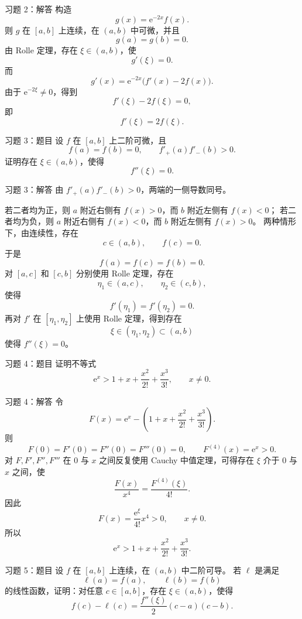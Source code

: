 \documentclass[aspectratio=169,10pt]{ctexbeamer}
\newcommand{\ee}{\mathrm{e}}
\begin{document}
\begin{frame}[t]{习题 2：解答}
\small
构造
\[
  g(x)=\ee^{-2x}f(x).
\]
则 $g$ 在 $[a,b]$ 上连续，在 $(a,b)$ 中可微，并且
\[
  g(a)=g(b)=0.
\]
由 Rolle 定理，存在 $\xi\in(a,b)$，使
\[
  g'(\xi)=0.
\]
而
\[
  g'(x)=\ee^{-2x}\bigl(f'(x)-2f(x)\bigr).
\]
由于 $\ee^{-2\xi}\ne0$，得到
\[
  f'(\xi)-2f(\xi)=0,
\]
即
\[
  f'(\xi)=2f(\xi).
\]
\end{frame}

\begin{frame}[t]{习题 3：题目}
\small
设 $f$ 在 $[a,b]$ 上二阶可微，且
\[
  f(a)=f(b)=0,\qquad f'_+(a)f'_-(b)>0.
\]
证明存在 $\xi\in(a,b)$，使得
\[
  f''(\xi)=0.
\]
\end{frame}

\begin{frame}[t]{习题 3：解答}
\footnotesize
由 $f'_+(a)f'_-(b)>0$，两端的一侧导数同号。

若二者均为正，则 $a$ 附近右侧有 $f(x)>0$，而 $b$ 附近左侧有 $f(x)<0$；
若二者均为负，则 $a$ 附近右侧有 $f(x)<0$，而 $b$ 附近左侧有 $f(x)>0$。
两种情形下，由连续性，存在
\[
  c\in(a,b),\qquad f(c)=0.
\]
于是
\[
  f(a)=f(c)=f(b)=0.
\]
对 $[a,c]$ 和 $[c,b]$ 分别使用 Rolle 定理，存在
\[
  \eta_1\in(a,c),\qquad \eta_2\in(c,b),
\]
使得
\[
  f'(\eta_1)=f'(\eta_2)=0.
\]
再对 $f'$ 在 $[\eta_1,\eta_2]$ 上使用 Rolle 定理，得到存在
\[
  \xi\in(\eta_1,\eta_2)\subset(a,b)
\]
使得 $f''(\xi)=0$。
\end{frame}

\begin{frame}[t]{习题 4：题目}
\small
证明不等式
\[
  \ee^x>1+x+\frac{x^2}{2!}+\frac{x^3}{3!},
  \qquad x\ne0.
\]
\end{frame}

\begin{frame}[t]{习题 4：解答}
\footnotesize
令
\[
  F(x)=\ee^x-\left(1+x+\frac{x^2}{2!}+\frac{x^3}{3!}\right).
\]
则
\[
  F(0)=F'(0)=F''(0)=F'''(0)=0,\qquad F^{(4)}(x)=\ee^x>0.
\]
对 $F,F',F'',F'''$ 在 $0$ 与 $x$ 之间反复使用 Cauchy 中值定理，可得存在 $\xi$ 介于 $0$ 与 $x$ 之间，使
\[
  \frac{F(x)}{x^4}=\frac{F^{(4)}(\xi)}{4!}.
\]
因此
\[
  F(x)=\frac{\ee^\xi}{4!}x^4>0,\qquad x\ne0.
\]
所以
\[
  \ee^x>1+x+\frac{x^2}{2!}+\frac{x^3}{3!}.
\]
\end{frame}

\begin{frame}[t]{习题 5：题目}
\small
设 $f$ 在 $[a,b]$ 上连续，在 $(a,b)$ 中二阶可导。
若 $\ell$ 是满足
\[
  \ell(a)=f(a),\qquad \ell(b)=f(b)
\]
的线性函数，证明：对任意 $c\in[a,b]$，存在 $\xi\in(a,b)$，使得
\[
  f(c)-\ell(c)=\frac{f''(\xi)}2(c-a)(c-b).
\]
\end{frame}
\end{document}
